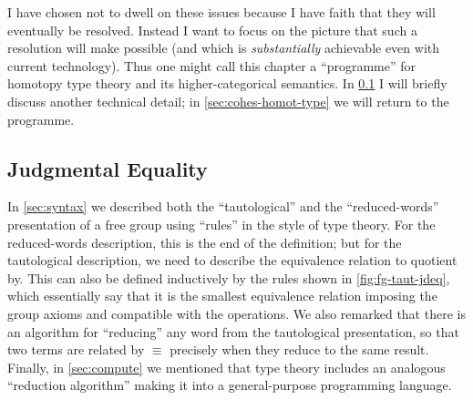 \documentclass[10pt]{article}
\let\jdeq\equiv
\def\oo{\ensuremath{\infty}}
\def\io{\ensuremath{(\oo,1)}}
\def\equiv{\mathsf{Equiv}}
\numberwithin{equation}{section}
\begin{document}
\begin{subappendices}
I have chosen not to dwell on these issues because I have faith that they will eventually be resolved.
Instead I want to focus on the picture that such a resolution will make possible (and which is \emph{substantially} achievable even with current technology).
Thus one might call this chapter a ``programme'' for homotopy type theory and its higher-categorical semantics.
In \cref{sec:equality} I will briefly discuss another technical detail; in \cref{sec:cohes-homot-type} we will return to the programme.

\subsection{Judgmental Equality}
\label{sec:equality}

In \cref{sec:syntax} we described both the ``tautological'' and the ``reduced-words'' presentation of a free group using ``rules'' in the style of type theory. %
For the reduced-words description, this is the end of the definition; but for the tautological description, we need to describe the equivalence relation to quotient by.
This can also be defined inductively by the rules shown in \cref{fig:fg-taut-jdeq}, which essentially say that it is the smallest equivalence relation imposing the group axioms and compatible with the operations.
We also remarked that there is an algorithm for ``reducing'' any word from the tautological presentation, so that two terms are related by $\jdeq$ precisely when they reduce to the same result.
Finally, in \cref{sec:compute} we mentioned that type theory includes an analogous ``reduction algorithm'' making it into a general-purpose programming language.


\end{subappendices}
\end{document}
